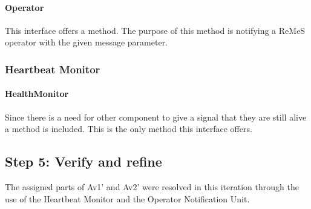 \paragraph{Operator}
\npar This interface offers a  method. The
purpose of this method is notifying a ReMeS operator with the given message
parameter. 

\subsubsection{Heartbeat Monitor}

\paragraph{HealthMonitor}
\npar Since there is a need for other component to give a signal that they are
still alive a method  is included. This is the only method this
interface offers.

\subsection{Step 5: Verify and refine}
\label{add:it8/verification}

\npar The assigned parts of Av1' and Av2' were resolved in this iteration
through the use of the Heartbeat Monitor and the Operator Notification Unit.
